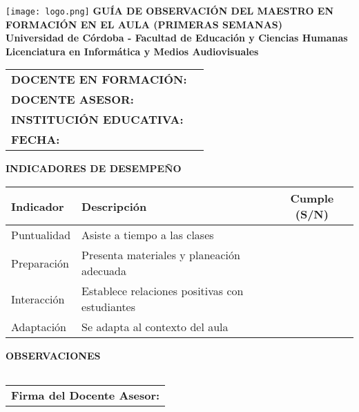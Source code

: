 \documentclass[a4paper,12pt]{article}
\begin{document}
\begin{center}
    \vspace*{1cm}
    \texttt{[image: logo.png]} %
    \vspace{0.5cm}
    \textbf{\Large GUÍA DE OBSERVACIÓN DEL MAESTRO EN FORMACIÓN EN EL AULA (PRIMERAS SEMANAS)} \\
    \vspace{0.5cm}
    \textbf{Universidad de Córdoba - Facultad de Educación y Ciencias Humanas} \\
    \textbf{Licenciatura en Informática y Medios Audiovisuales}
\end{center}

\vspace{0.5cm}
\begin{tabularx}{\textwidth}{@{}p{5cm}X@{}}
    \toprule
    \textbf{DOCENTE EN FORMACIÓN:} & \hrulefill \\
    \textbf{DOCENTE ASESOR:} & \hrulefill \\
    \textbf{INSTITUCIÓN EDUCATIVA:} & \hrulefill \\
    \textbf{FECHA:} & \hrulefill \\
    \bottomrule
\end{tabularx}

\vspace{0.5cm}
\noindent
\textbf{INDICADORES DE DESEMPEÑO}
\begin{table}[h]
    \centering
    \scriptsize
    \begin{tabularx}{\textwidth}{|p{5cm}|X|c|}
        \hline
        \textbf{Indicador} & \textbf{Descripción} & \textbf{Cumple (S/N)} \\
        \hline
        Puntualidad & Asiste a tiempo a las clases & \\ \hline
        Preparación & Presenta materiales y planeación adecuada & \\ \hline
        Interacción & Establece relaciones positivas con estudiantes & \\ \hline
        Adaptación & Se adapta al contexto del aula & \\ \hline
    \end{tabularx}
\end{table}

\vspace{0.5cm}
\noindent
\textbf{OBSERVACIONES}
\begin{tabularx}{\textwidth}{|X|}
    \hline
    \vspace{3cm} \\ \hline
\end{tabularx}

\vspace{0.5cm}
\begin{center}
    \begin{tabular}{p{7cm}}
        \hline
        \textbf{Firma del Docente Asesor:} \hrulefill \\
    \end{tabular}
\end{center}
\end{document}
